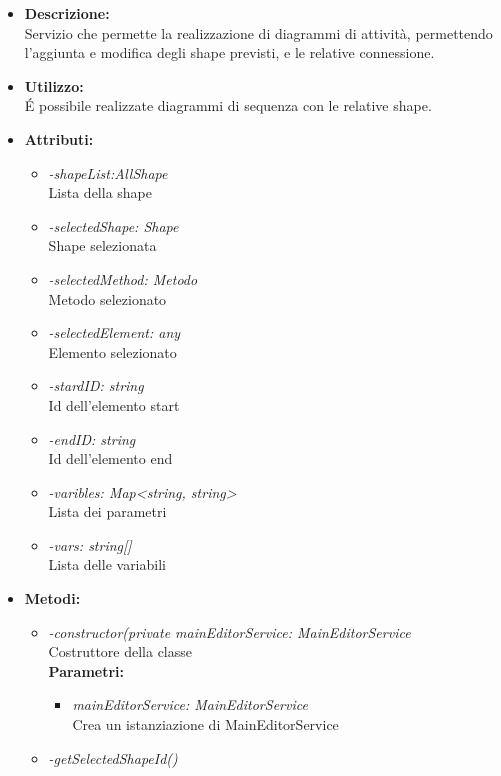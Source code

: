 \begin{itemize}
	\item \textbf{Descrizione:}\\
	Servizio che permette la realizzazione di diagrammi di attività, permettendo l'aggiunta e modifica degli shape previsti, e le relative connessione.
	\item \textbf{Utilizzo:}\\
	É possibile realizzate diagrammi di sequenza con le relative shape.
	
	\item \textbf{Attributi:}
		\begin{itemize}
			\item \emph{-shapeList:AllShape}\\
			Lista della shape
			\item \emph{-selectedShape: Shape}\\
			Shape selezionata
			\item \emph{-selectedMethod: Metodo}\\
			Metodo selezionato
			\item \emph{-selectedElement: any}\\
			Elemento selezionato
			\item \emph{-stardID: string}\\
			Id dell'elemento start
			\item \emph{-endID: string}\\
			Id dell'elemento end
			\item \emph{-varibles: Map<string, string>}\\
			Lista dei parametri
			\item \emph{-vars: string[]}\\
			Lista delle variabili
		\end{itemize}
	\item \textbf{Metodi:}
		\begin{itemize}
			\item \emph{-constructor(private mainEditorService: MainEditorService}\\
    		Costruttore della classe\\
    		\textbf{Parametri:}
    		\begin{itemize}
    			\item \emph{mainEditorService: MainEditorService}\\
    			Crea un istanziazione di MainEditorService
    		\end{itemize}
    		\item \emph{-getSelectedShapeId()}\\

\end{itemize}
\end{itemize}

